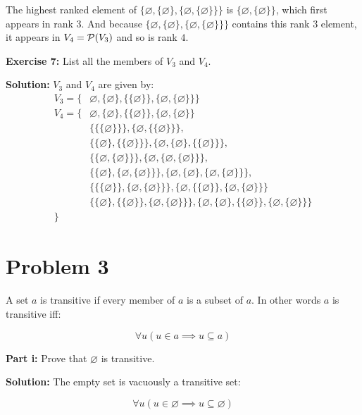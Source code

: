 \documentclass{article}
\begin{document}
The highest ranked element of $\{\varnothing, \{\varnothing\}, \{\varnothing, \{\varnothing\}\}\}$ is $\{\varnothing, \{\varnothing\}\}$, which first appears in rank $3$. And because $\{\varnothing, \{\varnothing\}, \{\varnothing, \{\varnothing\}\}\}$ contains this rank $3$ element, it appears in $V_4=\mathcal P(V_3)$ and so is rank $4$.
\bigskip

\noindent\textbf{Exercise 7:} List all the members of $V_3$ and $V_4$.
\bigskip

\noindent\textbf{Solution:} $V_3$ and $V_4$ are given by:
\begin{align*}
    V_3=\{&\varnothing, \{\varnothing\},\{\{\varnothing\}\}, \{\varnothing, \{\varnothing\}\}\}\\
    V_4=\{&\varnothing, \{\varnothing\},\{\{\varnothing\}\}, \{\varnothing, \{\varnothing\}\}\\
    &\{\{\{\varnothing\}\}\},\{\varnothing,\{\{\varnothing\}\}\},\\
    &\{\{\varnothing\},\{\{\varnothing\}\}\},\{\varnothing,\{\varnothing\},\{\{\varnothing\}\}\},\\
    &\{\{\varnothing, \{\varnothing\}\}\},\{\varnothing,\{\varnothing, \{\varnothing\}\}\},\\
    &\{\{\varnothing\},\{\varnothing,\{\varnothing\}\}\},\{\varnothing,\{\varnothing\},\{\varnothing,\{\varnothing\}\}\},\\
    &\{\{\{\varnothing\}\}, \{\varnothing,\{\varnothing\}\}\}, \{\varnothing,\{\{\varnothing\}\}, \{\varnothing,\{\varnothing\}\}\}\\
    &\{\{\varnothing\},\{\{\varnothing\}\}, \{\varnothing,\{\varnothing\}\}\},\{\varnothing,\{\varnothing\},\{\{\varnothing\}\}, \{\varnothing,\{\varnothing\}\}\}\\
    \}&
\end{align*}

\section*{Problem 3}
A set $a$ is transitive if every member of $a$ is a subset of $a$. In other words $a$ is transitive iff:

$$\forall u(u\in a\implies u\subseteq a)$$

\noindent\textbf{Part i:} Prove that $\varnothing$ is transitive.
\bigskip

\noindent\textbf{Solution:} The empty set is vacuously a transitive set:

$$\forall u(u\in \varnothing\implies u\subseteq \varnothing)$$
\end{document}
